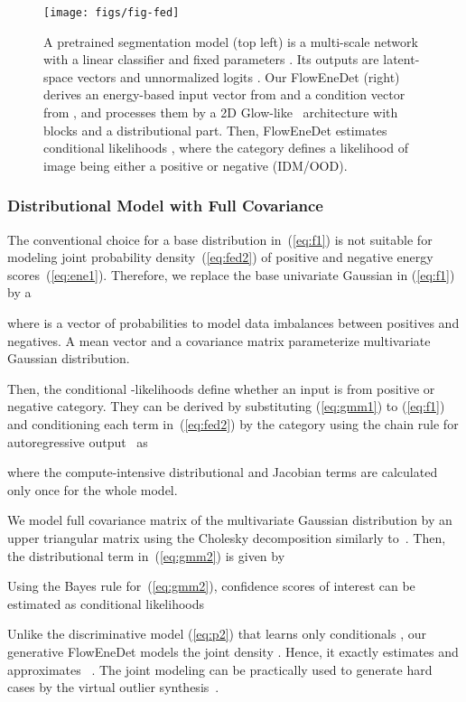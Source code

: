 \documentclass[accepted, startpage]{uai2023}
\begin{document}
\begin{figure*}[t]
	\centering
	\texttt{[image: figs/fig-fed]}
	\caption{A pretrained segmentation model  (top left) is a multi-scale network with a linear classifier and fixed parameters . Its outputs are latent-space vectors  and unnormalized logits . Our FlowEneDet (right) derives an energy-based input vector  from  and a condition vector  from , and processes them by a 2D Glow-like~\citep{NEURIPS2018_d139db6a} architecture with  blocks and a distributional part. Then, FlowEneDet estimates conditional likelihoods , where the  category defines a likelihood of image  being either a positive or negative (IDM/OOD).}
	\label{fig:FED}
\end{figure*}

\subsubsection{Distributional Model with Full Covariance}\label{subsec:nflowgmm}
The conventional choice for a base distribution in~(\ref{eq:f1}) is not suitable for modeling joint probability density~(\ref{eq:fed2}) of positive and negative energy scores~(\ref{eq:ene1}). Therefore, we replace the base univariate Gaussian in (\ref{eq:f1}) by a

where  is a vector of probabilities to model data imbalances between positives and negatives. A mean vector  and a covariance matrix  parameterize multivariate Gaussian distribution.

Then, the conditional -likelihoods  define whether an input is from positive or negative category. They can be derived by substituting (\ref{eq:gmm1}) to (\ref{eq:f1}) and conditioning each term in~(\ref{eq:fed2}) by the category  using the chain rule for autoregressive output~\citep{maf} as

where the compute-intensive distributional and Jacobian terms are calculated only once for the whole model.

We model full covariance matrix  of the multivariate Gaussian distribution by an upper triangular matrix  using the Cholesky decomposition similarly to~\citep{kruse}. Then, the distributional term in~(\ref{eq:gmm2}) is given by


Using the Bayes rule for~(\ref{eq:gmm2}), confidence scores of interest can be estimated as conditional likelihoods


Unlike the discriminative model (\ref{eq:p2}) that learns only conditionals , our generative FlowEneDet models the joint density . Hence, it exactly estimates  and approximates ~\citep{nalisnick19b}. The joint modeling can be practically used to generate hard cases by the virtual outlier synthesis~\citep{du2022vos}.
\end{document}
